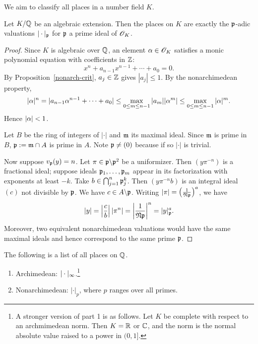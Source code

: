 We aim to classify all places in a number field $K$. %
\begin{pr}
Let $K/\mathbb{Q}$ be an algebraic extension. Then the places on $K$ are exactly the $\mathfrak{p}$-adic valuations $|\cdot|_{\mathfrak{p}}$ for $\mathfrak{p}$ a prime ideal of $\mathscr{O}_K$. %
\end{pr}
\begin{proof}
Since $K$ is algebraic over $\mathbb{Q}$, an element $\alpha\in \mathscr{O}_K$ satisfies a monic polynomial equation with coefficients in $\mathbb{Z}$:
\[
x^n+a_{n-1}x^{n-1}+\cdots +a_0=0.
\]
By Proposition~\ref{nonarch-crit}, $a_j\in \mathbb{Z}$ gives $|a_j|\le 1$.
By the nonarchimedean property,
\[|\alpha|^n=|a_{n-1}\alpha^{n-1}+\cdots +a_0|\le \max_{0\le m\le n-1}|a_{m}||\alpha^{m}|\le \max_{0\le m\le n-1}|\alpha|^m.\]
Hence $|\alpha|<1$.

Let $B$ be the ring of integers of $|\cdot|$ and $\mathfrak{m}$ its maximal ideal. Since $\mathfrak{m}$ is prime in $B$, $\mathfrak{p}:=\mathfrak{m}\cap A$ is prime in $A$. Note $\mathfrak{p}\ne (0)$ because if so $|\cdot|$ is trivial.

Now suppose $v_{\mathfrak{p}}(y)=n$. Let $\pi\in \mathfrak{p}\backslash \mathfrak{p}^2$ be a uniformizer. Then $(y\pi^{-n})$ is a fractional ideal; suppose ideals $\mathfrak{p}_1,\ldots, \mathfrak{p}_m$ appear in its factorization with exponents at least $-k$. Take $b\in \bigcap_{j=1}^n \mathfrak{p}_j^k$. Then $(y\pi^{-n}b)$ is an integral ideal $(c)$ not divisible by $\mathfrak{p}$. We have $c\in A\backslash \mathfrak{p}$. Writing $|\pi|=\left( {\frac{1}{\mathfrak N\mathfrak{p}}} \right)^a$, we have
\[
|y|=\left| {\frac{c}{b}} \right|\left| {\pi^n} \right|=\left| {\frac{1}{\mathfrak N \mathfrak{p}}} \right|^n=|y|_{\mathfrak{p}}^a.
\]
Moreover, two equivalent nonarchimedean valuations would have the same maximal ideals and hence correspond to the same prime $\mathfrak{p}$.
\end{proof}
\begin{thm}[Ostrowski]
The following is a list of all places on $\mathbb{Q}$.
\begin{enumerate}
\item
Archimedean: $|\cdot |_{\infty}$.\footnote{A stronger version of part 1 is as follows. Let $K$ be complete with respect to an archmimedean norm. Then $K=\mathbb{R}$ or $\mathbb{C}$, and the norm is the normal absolute value raised to a power in $(0,1]$.}
\item
Nonarchimedean: $|\cdot|_p$, where $p$ ranges over all primes.
\end{enumerate}
\end{thm}
